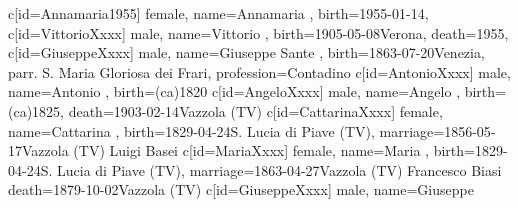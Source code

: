 \documentclass{article}
\begin{document}
\begin{midpage}
\begin{center}
\begin{genealogypicture}
{{{{{{{                        }
                        c[id=Annamaria1955]{
                            female,
                            name={Annamaria },
                            birth={1955-01-14}{},
                        }
                    }
                }
                c[id=VittorioXxxx]{
                    male,
                    name={Vittorio },
                    birth={1905-05-08}{Verona},
                    death={1955}{},
                }
            }
            c[id=GiuseppeXxxx]{
                male,
                name={Giuseppe Sante },
                birth={1863-07-20}{Venezia, parr. S. Maria Gloriosa dei Frari},
                profession={Contadino}
            }
        }
        c[id=AntonioXxxx]{
            male,
            name={Antonio },
            birth={(ca)1820}{}
        }
        c[id=AngeloXxxx]{
            male,
            name={Angelo },
            birth={(ca)1825}{},
            death={1903-02-14}{Vazzola (TV)}
        }
        c[id=CattarinaXxxx]{
            female,
            name={Cattarina },
            birth={1829-04-24}{S. Lucia di Piave (TV)},
            marriage={1856-05-17}{Vazzola (TV) \newline Luigi Basei}
        }
        c[id=MariaXxxx]{
            female,
            name={Maria },
            birth={1829-04-24}{S. Lucia di Piave (TV)},
            marriage={1863-04-27}{Vazzola (TV) \newline Francesco Biasi}
            death={1879-10-02}{Vazzola (TV)}
        }
        c[id=GiuseppeXxxx]{
            male,
            name={Giuseppe }
        }
    }
}
\end{genealogypicture}

\end{center}
\end{midpage}
\end{document}
